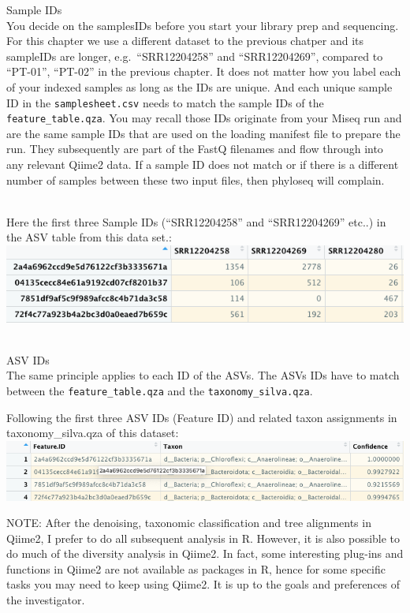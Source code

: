 \documentclass[
]{book}
\begin{document}
Sample IDs\\
You decide on the samplesIDs before you start your library prep and sequencing. For this chapter we use a different dataset to the previous chatper and its sampleIDs are longer, e.g.~``SRR12204258'' and ``SRR12204269'', compared to ``PT-01'', ``PT-02'' in the previous chapter. It does not matter how you label each of your indexed samples as long as the IDs are unique. And each unique sample ID in the \texttt{samplesheet.csv} needs to match the sample IDs of the \texttt{feature\_table.qza}. You may recall those IDs originate from your Miseq run and are the same sample IDs that are used on the loading manifest file to prepare the run. They subsequently are part of the FastQ filenames and flow through into any relevant Qiime2 data. If a sample ID does not match or if there is a different number of samples between these two input files, then phyloseq will complain.\\
\strut \\

Here the first three Sample IDs (``SRR12204258'' and ``SRR12204269'' etc..) in the ASV table from this data set.:\\
\includegraphics{./img/ASVIDs.png}\\
\strut \\

ASV IDs\\
The same principle applies to each ID of the ASVs. The ASVs IDs have to match between the \texttt{feature\_table.qza} and the \texttt{taxonomy\_silva.qza}.

Following the first three ASV IDs (Feature ID) and related taxon assignments in taxonomy\_silva.qza of this dataset:\\
\includegraphics{./img/ASVIDs2.png}

\hfill\break

NOTE: After the denoising, taxonomic classification and tree alignments in Qiime2, I prefer to do all subsequent analysis in R. However, it is also possible to do much of the diversity analysis in Qiime2. In fact, some interesting plug-ins and functions in Qiime2 are not available as packages in R, hence for some specific tasks you may need to keep using Qiime2. It is up to the goals and preferences of the investigator.
\end{document}
